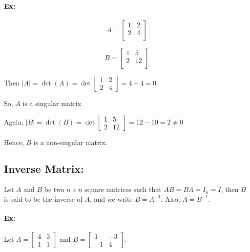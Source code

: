 \documentclass{article}
\begin{document}
    \paragraph{Ex:}
    \begin{minipage}{0.4\textwidth}
    \[ A = 
    \begin{bmatrix}
    1 & 2 \\
    2 & 4 \\
    \end{bmatrix} \]
    \end{minipage}
    \begin{minipage}{0.1\textwidth}
    \end{minipage} 
    \begin{minipage}{0.4\textwidth}
    \[ B = 
    \begin{bmatrix}
    1 & 5 \\
    2 & 12 \\
    \end{bmatrix} \]
    \end{minipage}

    \vspace{20pt}    
    Then \(|A| = \det(A) = \det \begin{bmatrix} 1 & 2 \\ 2 & 4 \end{bmatrix} = 4 - 4 = 0\)
    
    So, \(A\) is a singular matrix
    
    \vspace{20pt}
    Again, \(|B| = \det(B) = \det \begin{bmatrix} 1 & 5 \\ 2 & 12 \end{bmatrix} = 12 - 10 = 2 \neq 0\)
    
    Hence, \( B \) is a non-singular matrix.
\vspace{20pt}
\subsection{Inverse Matrix:}
\vspace{10pt}
    Let \( A \) and \( B \) be two \(n \times n\) square matrices such that \( AB = BA = I_{n} = I \), then \( B \) is said to be the inverse of \( A \), and we write \( B = A^{-1} \). Also, \( A = B^{-1} \).
    \vspace{20pt}
    \paragraph{Ex:}
    Let \( A = \begin{bmatrix} 4 & 3 \\ 1 & 1 \end{bmatrix} \) and \( B = \begin{bmatrix} 1 & -3 \\ -1 & 4 \end{bmatrix} \).
    
\end{document}

